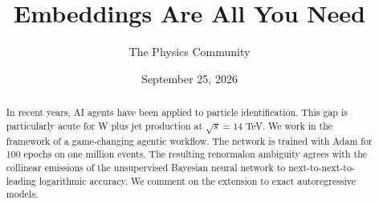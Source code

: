 \documentclass[11pt]{article}
\title{Embeddings Are All You Need}
\author{The Physics Community}
\date{September 25, 2026}
\numberwithin{equation}{section}
\theoremstyle{definition}
\theoremstyle{remark}
\begin{document}
\maketitle
\begin{abstract}
In recent years, AI agents have been applied to particle identification.
This gap is particularly acute for W plus jet production at $\sqrt{s} =
14$ TeV. We work in the framework of a game-changing agentic workflow.
The network is trained with Adam for 100 epochs on one million events.
The resulting renormalon ambiguity agrees with the collinear emissions
of the unsupervised Bayesian neural network to next-to-next-to-leading
logarithmic accuracy. We comment on the extension to exact
autoregressive models.
\end{abstract}
\tableofcontents





\nocite{*}


\end{document}
